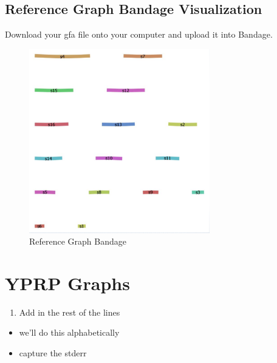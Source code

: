 \documentclass[
]{book}
\newenvironment{Shaded}{\begin{snugshade}}{\end{snugshade}}
\newcommand{\AttributeTok}[1]{\textcolor[rgb]{0.77,0.63,0.00}{#1}}
\newcommand{\DecValTok}[1]{\textcolor[rgb]{0.00,0.00,0.81}{#1}}
\newcommand{\ExtensionTok}[1]{#1}
\newcommand{\FunctionTok}[1]{\textcolor[rgb]{0.00,0.00,0.00}{#1}}
\newcommand{\KeywordTok}[1]{\textcolor[rgb]{0.13,0.29,0.53}{\textbf{#1}}}
\newcommand{\NormalTok}[1]{#1}
\newcommand{\OperatorTok}[1]{\textcolor[rgb]{0.81,0.36,0.00}{\textbf{#1}}}
\newcommand{\PreprocessorTok}[1]{\textcolor[rgb]{0.56,0.35,0.01}{\textit{#1}}}
\newcommand{\VariableTok}[1]{\textcolor[rgb]{0.00,0.00,0.00}{#1}}
\providecommand{\tightlist}{%
  \setlength{\itemsep}{0pt}\setlength{\parskip}{0pt}}
\begin{document}
\hypertarget{reference-graph-bandage-visualization}{%
\subsection*{Reference Graph Bandage Visualization}\label{reference-graph-bandage-visualization}}

Download your gfa file onto your computer and upload it into Bandage.

\begin{figure}
\centering
\includegraphics[width=0.7\textwidth,height=\textheight]{./Figures/Bandage2.png}
\caption{Reference Graph Bandage}
\end{figure}

\hypertarget{yprp-graphs}{%
\section{YPRP Graphs}\label{yprp-graphs}}

\begin{enumerate}
\def\labelenumi{\arabic{enumi}.}
\tightlist
\item
  Add in the rest of the lines
\end{enumerate}

\begin{itemize}
\tightlist
\item
  we'll do this alphabetically
\item
  capture the stderr
\end{itemize}

\begin{Shaded}
\end{Shaded}
\end{document}
